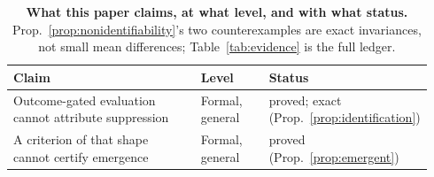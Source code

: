 \documentclass{article}
\begin{document}
\begin{table}[t]
\centering
\small\setlength{\tabcolsep}{4pt}
\caption{\textbf{What this paper claims, at what level, and with what status.} Prop.~\ref{prop:nonidentifiability}'s two counterexamples are exact invariances, not small mean differences; Table~\ref{tab:evidence} is the full ledger.}
\label{tab:claims}
\begin{tabular}{@{}p{0.51\linewidth}p{0.17\linewidth}p{0.26\linewidth}@{}}
\toprule
Claim & Level & Status \\
\midrule
Outcome-gated evaluation cannot attribute suppression & Formal, general & proved; exact (Prop.~\ref{prop:identification}) \\
A criterion of that shape cannot certify emergence & Formal, general & proved (Prop.~\ref{prop:emergent}) \\

\end{tabular}
\end{table}
\end{document}
